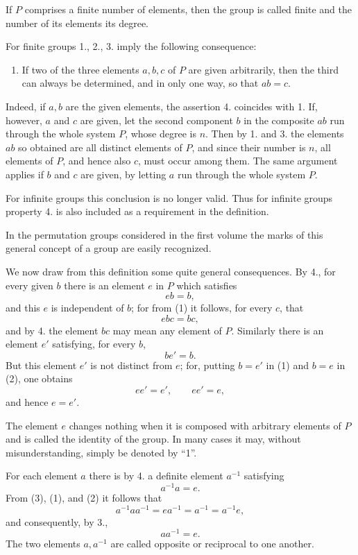 \documentclass[11pt]{article}
\begin{document}
If $P$ comprises a finite number of elements, then the group is called finite and the number of its elements its degree.

For finite groups 1., 2., 3. imply the following consequence:
\begin{enumerate}[resume,label=\arabic*.]
\item If two of the three elements $a,b,c$ of $P$ are given arbitrarily, then the third can always be determined, and in only one way, so that $ab=c$.
\end{enumerate}
Indeed, if $a,b$ are the given elements, the assertion 4. coincides with 1. If, however, $a$ and $c$ are given, let the second component $b$ in the composite $ab$ run through the whole system $P$, whose degree is $n$. Then by 1. and 3. the elements $ab$ so obtained are all distinct elements of $P$, and since their number is $n$, all elements of $P$, and hence also $c$, must occur among them. The same argument applies if $b$ and $c$ are given, by letting $a$ run through the whole system $P$.

For infinite groups this conclusion is no longer valid. Thus for infinite groups property 4. is also included as a requirement in the definition.

In the permutation groups considered in the first volume the marks of this general concept of a group are easily recognized.

We now draw from this definition some quite general consequences. By 4., for every given $b$ there is an element $e$ in $P$ which satisfies
\begin{equation}
eb=b,
\tag{1}
\end{equation}
and this $e$ is independent of $b$; for from (1) it follows, for every $c$, that
\[
ebc=bc,
\]
and by 4. the element $bc$ may mean any element of $P$. Similarly there is an element $e'$ satisfying, for every $b$,
\begin{equation}
be'=b.
\tag{2}
\end{equation}
But this element $e'$ is not distinct from $e$; for, putting $b=e'$ in (1) and $b=e$ in (2), one obtains
\[
ee'=e',\qquad ee'=e,
\]
and hence $e=e'$.

The element $e$ changes nothing when it is composed with arbitrary elements of $P$ and is called the identity of the group. In many cases it may, without misunderstanding, simply be denoted by ``1''.

For each element $a$ there is by 4. a definite element $a^{-1}$ satisfying
\begin{equation}
a^{-1}a=e.
\tag{3}
\end{equation}
From (3), (1), and (2) it follows that
\[
a^{-1}aa^{-1}=ea^{-1}=a^{-1}=a^{-1}e,
\]
and consequently, by 3.,
\begin{equation}
aa^{-1}=e.
\tag{4}
\end{equation}
The two elements $a,a^{-1}$ are called opposite or reciprocal to one another.
\end{document}
